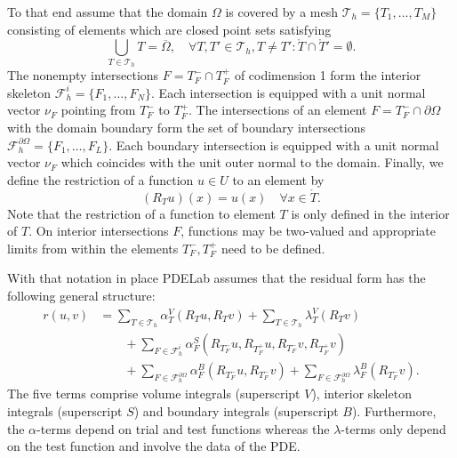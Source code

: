 \documentclass[a4paper,12pt]{article}
\theoremstyle{definition}
\begin{document}
To that end assume that the domain $\Omega$ is covered by a mesh
$\mathcal{T}_h = \{T_1, \ldots, T_M\}$ consisting of elements
which are closed point sets satisfying
\begin{equation}
\bigcup_{T\in \mathcal{T}_h} T = \overline{\Omega}, \quad
\forall T, T' \in \mathcal{T}_h, T\neq T' : \mathring{T} \cap \mathring{T}' = \emptyset .
\end{equation}
The nonempty intersections $F = T_F^-\cap T_F^+$
of codimension 1 form the interior skeleton $\mathcal{F}_h^i=\{F_1,\ldots,F_N\}$.
Each intersection is equipped with a unit normal vector $\nu_F$ pointing from $T_F^-$ to $T_F^+$.
The intersections of an element $F=T_F^-\cap\partial\Omega$ with the domain
boundary form the set of boundary intersections $\mathcal{F}_h^{\partial\Omega}=
\{F_1,\ldots,F_L\}$. Each boundary intersection is equipped with a unit normal vector
$\nu_F$ which coincides with the unit outer normal to the domain. Finally, we define the restriction
of a function $u\in U$ to an element by
\begin{equation*}
(R_T u)(x) = u(x) \quad \forall x\in\mathring{T} .
\end{equation*}
Note that the restriction of a function to element $T$ is only defined in
the interior of $T$. On interior intersections $F$, functions may be two-valued
and appropriate limits from within the elements $T_F^-, T_F^+$ need to be defined.

With that notation in place PDELab assumes that the residual form has
the following general structure:
\begin{equation}
\begin{split}
r(u,v) &=
\sum_{T\in\mathcal{T}_h} \alpha_T^V(R_T u, R_T v)
+ \sum_{T\in\mathcal{T}_h} \lambda_T^V(R_T v) \\
&\qquad+ \sum_{F\in\mathcal{F}_h^i} \alpha_F^S(R_{T_F^-} u,R_{T_F^+} u, R_{T_F^-} v, R_{T_F^+} v)\\
&\qquad+ \sum_{F\in\mathcal{F}_h^{\partial\Omega}} \alpha_F^B(R_{T_F^-} u, R_{T_F^-} v)
+ \sum_{F\in\mathcal{F}_h^{\partial\Omega}} \lambda_F^B(R_{T_F^-} v) .
\end{split}\label{eq:GeneralResidualForm}
\end{equation}
The five terms comprise volume integrals (superscript $V$), interior skeleton integrals
(superscript $S$) and boundary integrals (superscript $B$). Furthermore, the
$\alpha$-terms depend on trial and test functions whereas the $\lambda$-terms only
depend on the test function and involve the data of the PDE.
\end{document}

